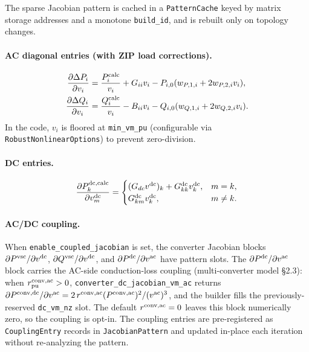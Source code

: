 The sparse Jacobian pattern is cached in a \texttt{PatternCache} keyed by
matrix storage addresses and a monotone \texttt{build\_id}, and is rebuilt only
on topology changes.

\paragraph{AC diagonal entries (with ZIP load corrections).}
\begin{align}
\frac{\partial \Delta P_i}{\partial v_i}
&= \frac{P_i^{\mathrm{calc}}}{v_i} + G_{ii}v_i
- P_{i,0}(w_{P,1,i}+2w_{P,2,i}v_i), \\
\frac{\partial \Delta Q_i}{\partial v_i}
&= \frac{Q_i^{\mathrm{calc}}}{v_i} - B_{ii}v_i
- Q_{i,0}(w_{Q,1,i}+2w_{Q,2,i}v_i).
\end{align}
In the code, \(v_i\) is floored at \texttt{min\_vm\_pu}
(configurable via \texttt{RobustNonlinearOptions}) to prevent zero-division.

\paragraph{DC entries.}
\begin{align}
\frac{\partial P_k^{\mathrm{dc,calc}}}{\partial v_m^{\mathrm{dc}}} =
\begin{cases}
(G_{dc}v^{\mathrm{dc}})_k + G_{kk}^{\mathrm{dc}}v_k^{\mathrm{dc}}, & m=k, \\
G_{km}^{\mathrm{dc}}v_k^{\mathrm{dc}}, & m\neq k.
\end{cases}
\end{align}

\paragraph{AC/DC coupling.}
When \texttt{enable\_coupled\_jacobian} is set, the converter Jacobian blocks
\(\partial P^{\mathrm{vsc}}/\partial v^{\mathrm{dc}}\),
\(\partial Q^{\mathrm{vsc}}/\partial v^{\mathrm{dc}}\), and
\(\partial P^{\mathrm{dc}}/\partial v^{\mathrm{ac}}\) have pattern slots.  The
\(\partial P^{\mathrm{dc}}/\partial v^{\mathrm{ac}}\) block carries the AC-side
conduction-loss coupling (multi-converter model \S2.3): when
\(r^{\mathrm{conv,ac}}_{\text{pu}}>0\), \texttt{converter\_dc\_jacobian\_vm\_ac}
returns
\(\partial P^{\mathrm{conv,dc}}/\partial v^{\mathrm{ac}}
= 2\,r^{\mathrm{conv,ac}} (P^{\mathrm{conv,ac}})^2/(v^{\mathrm{ac}})^3\),
and the builder fills the previously-reserved \texttt{dc\_vm\_nz} slot.  The
default \(r^{\mathrm{conv,ac}}=0\) leaves this block numerically zero, so the
coupling is opt-in.  The coupling entries are pre-registered as
\texttt{CouplingEntry} records in \texttt{JacobianPattern} and updated in-place
each iteration without re-analyzing the pattern.

